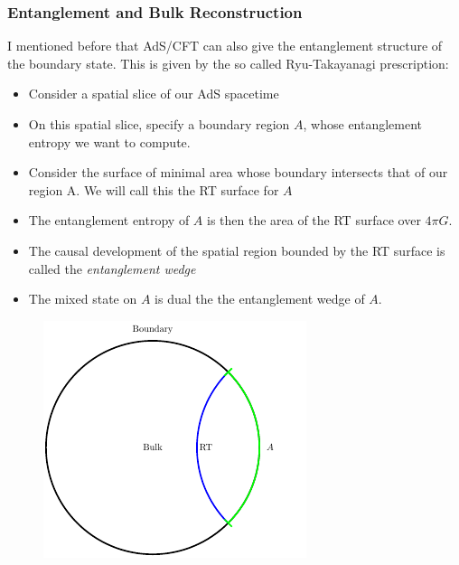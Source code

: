 \documentclass[8pt,aspectratio=169]{beamer}
\begin{document}
\begin{frame}
\frametitle{Entanglement and Bulk Reconstruction}

I mentioned before that AdS/CFT can also give the entanglement structure of the boundary state. This is given by the so called Ryu-Takayanagi prescription: 

\begin{minipage}[t]{0.55\linewidth}

\begin{itemize}

\item Consider a spatial slice of our AdS spacetime

\item On this spatial slice, specify a boundary region $A$, whose entanglement entropy we want to compute. 

\item Consider the surface of minimal area whose boundary intersects that of our region A. We will call this the RT surface for $A$

\item The entanglement entropy of $A$ is then the area of the RT surface over $4\pi G$.

\item The causal development of the spatial region bounded by the RT surface is called the \textit{entanglement wedge}

\item The mixed state on $A$ is dual the the entanglement wedge of $A$.

\end{itemize}

\end{minipage}\hfill
%
\begin{minipage}[t]{0.44\linewidth}

\begin{figure}
    \begin{center}
    
        \includegraphics[scale=1]{RT}    
    

\end{center}
\end{figure}
\end{minipage}
\end{frame}
\end{document}
